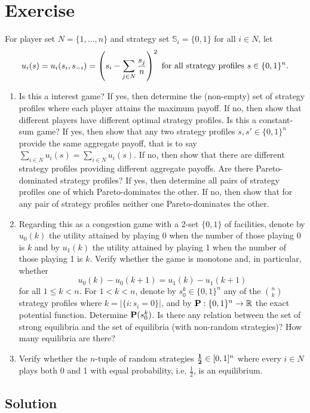 \documentclass{article}
\begin{document}
\section{Exercise}
For player set $N=\{1,\ldots ,n\}$ and strategy set $\mathbb S_i=\{0,1\}$ for all $i\in N$, let
$$u_i(s)=u_i(s_i,s_{-i})=\left(s_i-\sum_{j\in N}\frac{s_j}{n}\right)^2\text{ for all strategy profiles }s\in\{0,1\}^n\text .$$
\begin{enumerate}
\item Is this a interest game? If yes, then determine the (non-empty) set of strategy profiles where each player attains the maximum payoff. If no, then show
that different players have different optimal strategy profiles. Is this a constant-sum game? If yes, then show that any two strategy profiles $s,s'\in\{0,1\}^n$
provide the same aggregate payoff, that is to say $\sum_{i\in N}u_i(s)=\sum_{i\in N}u_i(s)$. If no, then show that there are different strategy profiles providing
different aggregate payoffs. Are there Pareto-dominated strategy profiles? If yes, then determine all pairs of strategy profiles one of which Pareto-dominates the
other. If no, then show that for any pair of strategy profiles neither one Pareto-dominates the other.

\item Regarding this as a congestion game with a 2-set $\{0,1\}$ of facilities, denote by $u_0(k)$ the utility attained by playing 0 when the number of those playing 0
is $k$ and by $u_1(k)$ the utility attained by playing 1 when the number of those playing 1 is $k$. Verify whether the game is monotone and, in particular, whether
$$u_0(k)-u_0(k+1)=u_1(k)-u_1(k+1)$$ for all $1\leq k<n$. For $1<k<n$, denote by $s_0^k\in\{0,1\}^n$ any of the $\binom{n}{k}$ strategy profiles where $k=|\{i:s_i=0\}|$,
and by $\textbf P:\{0,1\}^n\rightarrow\mathbb R$ the exact potential function. Determine $\textbf P(s_0^k)$. Is there any relation between the set of strong equilibria
and the set of equilibria (with non-random strategies)? How many equilibria are there?

\item Verify whether the $n$-tuple of random strategies $\frac{\textbf 1}{\textbf 2}\in[0,1]^n$ where every $i\in N$ plays both 0 and 1 with equal probability, i.e.
$\frac{1}{2}$, is an equilibrium. 
\end{enumerate}

\subsection{Solution}
\end{document}
